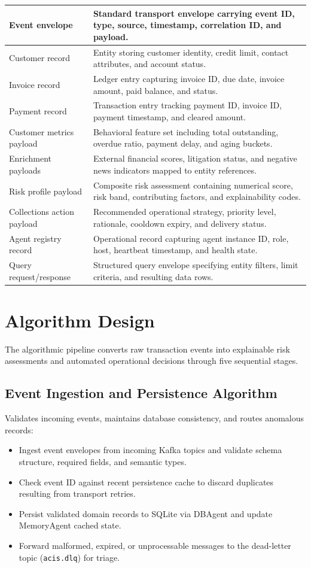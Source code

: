 \documentclass[a4paper, 12pt]{report}
\begin{document}
\begin{longtable}{|L{0.28\textwidth}|L{0.62\textwidth}|}
    Event envelope & Standard transport envelope carrying event ID, type, source, timestamp, correlation ID, and payload. \\
    \hline
    Customer record & Entity storing customer identity, credit limit, contact attributes, and account status. \\
    \hline
    Invoice record & Ledger entry capturing invoice ID, due date, invoice amount, paid balance, and status. \\
    \hline
    Payment record & Transaction entry tracking payment ID, invoice ID, payment timestamp, and cleared amount. \\
    \hline
    Customer metrics payload & Behavioral feature set including total outstanding, overdue ratio, payment delay, and aging buckets. \\
    \hline
    Enrichment payloads & External financial scores, litigation status, and negative news indicators mapped to entity references. \\
    \hline
    Risk profile payload & Composite risk assessment containing numerical score, risk band, contributing factors, and explainability codes. \\
    \hline
    Collections action payload & Recommended operational strategy, priority level, rationale, cooldown expiry, and delivery status. \\
    \hline
    Agent registry record & Operational record capturing agent instance ID, role, host, heartbeat timestamp, and health state. \\
    \hline
    Query request/response & Structured query envelope specifying entity filters, limit criteria, and resulting data rows. \\
\end{longtable}

\section{Algorithm Design}
The algorithmic pipeline converts raw transaction events into explainable risk assessments and automated operational decisions through five sequential stages.

\subsection{Event Ingestion and Persistence Algorithm}
Validates incoming events, maintains database consistency, and routes anomalous records:
\begin{itemize}[itemsep=2pt]
    \item Ingest event envelopes from incoming Kafka topics and validate schema structure, required fields, and semantic types.
    \item Check event ID against recent persistence cache to discard duplicates resulting from transport retries.
    \item Persist validated domain records to SQLite via DBAgent and update MemoryAgent cached state.
    \item Forward malformed, expired, or unprocessable messages to the dead-letter topic (\texttt{acis.dlq}) for triage.
\end{itemize}
\end{document}
